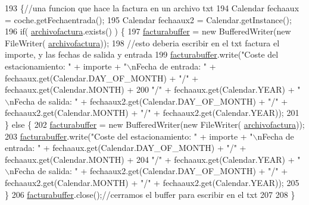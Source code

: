 \begin{DoxyCode}
193                                                                                      \{\textcolor{comment}{//una funcion que
       hace la factura en un archivo txt}
194         Calendar fechaaux = coche.getFechaentrada();
195         Calendar fechaaux2 = Calendar.getInstance();
196         \textcolor{keywordflow}{if}( \mbox{\hyperlink{classejercicio2_1_1_interfaz_a897fa4f18ca280fa92941fdf25e8a1f1}{archivofactura}}.exists() ) \{ 
197         \mbox{\hyperlink{classejercicio2_1_1_interfaz_aaecb9f9f0c0f51b6da35cd9c5a580c84}{facturabuffer}} = \textcolor{keyword}{new} BufferedWriter(\textcolor{keyword}{new} FileWriter(
      \mbox{\hyperlink{classejercicio2_1_1_interfaz_a897fa4f18ca280fa92941fdf25e8a1f1}{archivofactura}}));
198         \textcolor{comment}{//esto deberia escribir en el txt factura el importe, y las fechas de salida y entrada}
199         \mbox{\hyperlink{classejercicio2_1_1_interfaz_aaecb9f9f0c0f51b6da35cd9c5a580c84}{facturabuffer}}.write(\textcolor{stringliteral}{"Coste del estacionamiento: "} + importe + \textcolor{stringliteral}{"\(\backslash\)nFecha de entrada: "} +
       fechaaux.get(Calendar.DAY\_OF\_MONTH) + \textcolor{stringliteral}{"/"} + fechaaux.get(Calendar.MONTH) + 
200         \textcolor{stringliteral}{"/"} + fechaaux.get(Calendar.YEAR) + \textcolor{stringliteral}{"\(\backslash\)nFecha de salida: "} + fechaaux2.get(Calendar.DAY\_OF\_MONTH) + \textcolor{stringliteral}{
      "/"} + fechaaux2.get(Calendar.MONTH) + \textcolor{stringliteral}{"/"} + fechaaux2.get(Calendar.YEAR));
201         \} \textcolor{keywordflow}{else} \{
202         \mbox{\hyperlink{classejercicio2_1_1_interfaz_aaecb9f9f0c0f51b6da35cd9c5a580c84}{facturabuffer}} = \textcolor{keyword}{new} BufferedWriter(\textcolor{keyword}{new} FileWriter(
      \mbox{\hyperlink{classejercicio2_1_1_interfaz_a897fa4f18ca280fa92941fdf25e8a1f1}{archivofactura}}));
203         \mbox{\hyperlink{classejercicio2_1_1_interfaz_aaecb9f9f0c0f51b6da35cd9c5a580c84}{facturabuffer}}.write(\textcolor{stringliteral}{"Coste del estacionamiento: "} + importe + \textcolor{stringliteral}{"\(\backslash\)nFecha de entrada: "} +
       fechaaux.get(Calendar.DAY\_OF\_MONTH) + \textcolor{stringliteral}{"/"} + fechaaux.get(Calendar.MONTH) + 
204         \textcolor{stringliteral}{"/"} + fechaaux.get(Calendar.YEAR) + \textcolor{stringliteral}{"\(\backslash\)nFecha de salida: "} + fechaaux2.get(Calendar.DAY\_OF\_MONTH) + \textcolor{stringliteral}{
      "/"} + fechaaux2.get(Calendar.MONTH) + \textcolor{stringliteral}{"/"} + fechaaux2.get(Calendar.YEAR));
205         \}
206         \mbox{\hyperlink{classejercicio2_1_1_interfaz_aaecb9f9f0c0f51b6da35cd9c5a580c84}{facturabuffer}}.close();\textcolor{comment}{//cerramos el buffer para escribir en el txt}
207         
208     \}
\end{DoxyCode}
\mbox{\label{classejercicio2_1_1_interfaz_a7be742922e57abfe6657157ca275d7fe}} 
